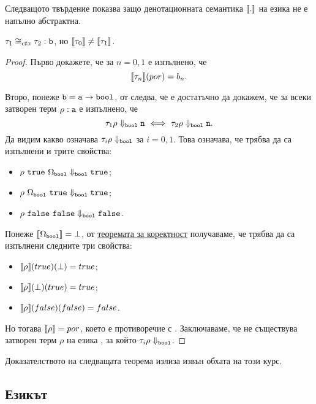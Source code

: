 Следващото твърдение показва защо денотационната семантика $\llbracket{.}\rrbracket$ на езика \PCFPP не е напълно абстрактна.
\begin{framed}
\begin{proposition}
  $\tau_1 \cong_{ctx} \tau_2 : \texttt{b}$, но $\llbracket{\tau_0}\rrbracket \neq \llbracket{\tau_1}\rrbracket$.
\end{proposition}  
\end{framed}
\begin{proof}
  Първо докажете, че за $n = 0,1$ е изпълнено, че
  \[\llbracket{\tau_n}\rrbracket(por) = b_n.\]  
  
  Второ, понеже $\texttt{b} = \texttt{a} \to \texttt{bool}$, от  следва, че е достатъчно да докажем, че
  за всеки затворен терм $\rho:\texttt{a}$ е изпълнено, че
  \[\tau_1\rho \Downarrow_{\texttt{bool}} \texttt{n} \ \Longleftrightarrow\  \tau_2\rho \Downarrow_{\texttt{bool}} \texttt{n}.\]
  Да видим какво означава $\tau_i \rho \Downarrow_{\texttt{bool}}$ за $i = 0,1$.
  Това означава, че трябва да са изпълнени и трите свойства:
  \begin{itemize}
  \item
    $\rho\ \texttt{true}\ \Omega_{\texttt{bool}} \Downarrow_{\texttt{bool}} \texttt{true}$;%
  \item
    $\rho\ \Omega_{\texttt{bool}}\ \texttt{true} \Downarrow_{\texttt{bool}} \texttt{true}$;%
  \item
    $\rho\ \texttt{false}\ \texttt{false} \Downarrow_{\texttt{bool}} \texttt{false}$.
  \end{itemize}
  Понеже $\llbracket{\Omega_{\texttt{bool}}}\rrbracket = \bot$, от \hyperref[th:pcf:soundness]{теоремата за коректност} получаваме, че трябва да са изпълнени следните три свойства:
  \begin{itemize}
  \item
    $\llbracket{\rho}\rrbracket(true)(\bot) = true$;
  \item
    $\llbracket{\rho}\rrbracket(\bot)(true) = true$;
  \item
    $\llbracket{\rho}\rrbracket(false)(false) = false$.
  \end{itemize}
  Но тогава $\llbracket{\rho}\rrbracket = por$, което е противоречие с .
  Заключаваме, че не съществува затворен терм $\rho$ на езика \PCFPP, за който $\tau_i\rho\Downarrow_{\texttt{bool}}$.
\end{proof}

Доказателството на следващата теорема излиза извън обхата на този курс.


\subsection{Езикът \PCFPOR}

